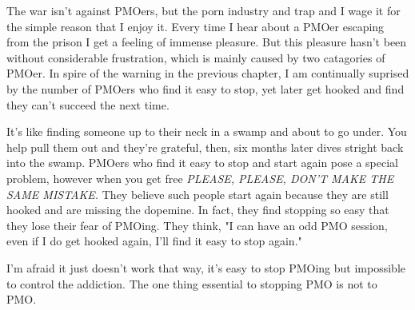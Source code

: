 \documentclass[easypeasy.tex]{subfiles}
\begin{document}
The war isn't against PMOers, but the porn industry and trap and I wage it for the simple reason that I enjoy it. Every time I hear about a PMOer escaping from the prison I get a feeling of immense pleasure. But this pleasure hasn't been without considerable frustration, which is mainly caused by two catagories of PMOer. In spire of the warning in the previous chapter, I am continually suprised by the number of PMOers who find it easy to stop, yet later get hooked and find they can't succeed the next time.

It's like finding someone up to their neck in a swamp and about to go under. You help pull them out and they're grateful, then, six months later dives stright back into the swamp. PMOers who find it easy to stop and start again pose a special problem, however when you get free \textit{PLEASE, PLEASE, DON'T MAKE THE SAME MISTAKE.} They believe such people start again because they are still hooked and are missing the dopemine. In fact, they find stopping so easy that they lose their fear of PMOing. They think, "I can have an odd PMO session, even if I do get hooked again, I'll find it easy to stop again."

I'm afraid it just doesn't work that way, it's easy to stop PMOing but impossible to control the addiction. The one thing essential to stopping PMO is not to PMO. 
\end{document}
